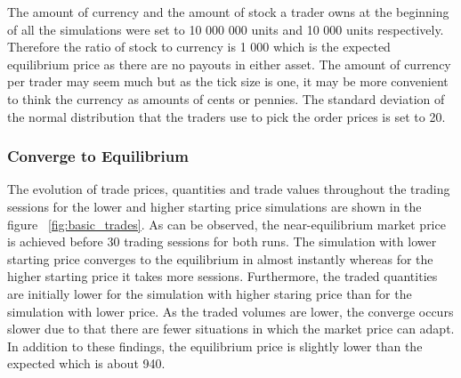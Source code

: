 The amount of currency and the amount of stock 
a trader owns at the beginning of all the simulations were set to
10 000 000 units and 10 000 units respectively. Therefore
the ratio of stock to currency is 1 000 which
is the expected equilibrium price as there are
no payouts in either asset. The amount of currency
per trader may seem much but as the tick size is one,
it may be more convenient to think the currency as amounts
of cents or pennies. The standard deviation of
the normal distribution that the traders use to pick the order prices
is set to 20.



\subsubsection{Converge to Equilibrium}
The evolution of trade prices, quantities and trade values throughout
the trading sessions for the lower and higher starting price simulations 
are shown in the figure ~\ref{fig:basic_trades}. As can be observed,
the near-equilibrium market price is achieved before 30 trading
sessions for both runs. The simulation with lower starting price converges
to the equilibrium in almost instantly whereas for the higher starting
price it takes more sessions. Furthermore, the traded quantities are
initially lower for the simulation with higher staring price than 
for the simulation with lower price. As the traded volumes are lower,
the converge occurs slower due to that there are fewer situations in
which the market price can adapt. In addition to these findings, 
the equilibrium price is slightly lower than the expected which is 
about 940.

